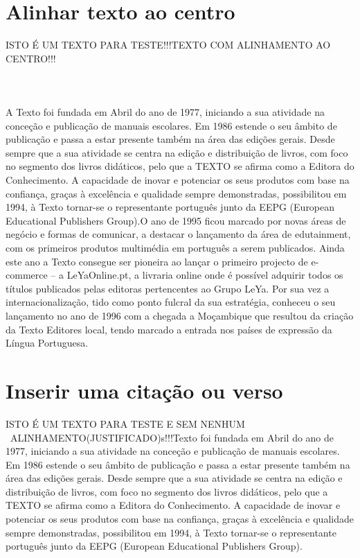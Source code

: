 \documentclass[a4paper,11pt]{article}%
\begin{document}
\section{Alinhar texto ao centro}
\begin{center}
ISTO É UM TEXTO PARA TESTE!!!\newline TEXTO COM ALINHAMENTO AO CENTRO!!!\newline \paragraph{\ \ }
A Texto foi fundada em Abril do ano de 1977, iniciando a sua atividade na conceção e publicação de manuais escolares. Em 1986 estende o seu âmbito de publicação e passa a estar presente também na área das edições gerais. Desde sempre que a sua atividade se centra na edição e distribuição de livros, com foco no segmento dos livros didáticos, pelo que a TEXTO se afirma como a Editora do Conhecimento. A capacidade de inovar e potenciar os seus produtos com base na confiança, graças à excelência e qualidade sempre demonstradas, possibilitou em 1994, à Texto tornar-se o representante português junto da EEPG (European Educational Publishers Group).O ano de 1995 ficou marcado por novas áreas de negócio e formas de comunicar, a destacar o lançamento da área de edutainment, com os primeiros produtos multimédia em português a serem publicados. Ainda este ano a Texto consegue ser pioneira ao lançar o primeiro projecto de e-commerce – a LeYaOnline.pt, a livraria online onde é possível adquirir todos os títulos publicados pelas editoras pertencentes ao Grupo LeYa. Por sua vez a internacionalização, tido como ponto fulcral da sua estratégia, conheceu o seu lançamento no ano de 1996 com a chegada a Moçambique que resultou da criação da Texto Editores local, tendo marcado a entrada nos países de expressão da Língua Portuguesa.
\end{center}


\newpage
\section{Inserir uma citação ou verso}
ISTO É UM TEXTO PARA TESTE E SEM NENHUM \ ALINHAMENTO(JUSTIFICADO)s!!!\newline  Texto foi fundada em Abril do ano de 1977, iniciando a sua atividade na conceção e publicação de manuais escolares. Em 1986 estende o seu âmbito de publicação e passa a estar presente também na área das edições gerais. Desde sempre que a sua atividade se centra na edição e distribuição de livros, com foco no segmento dos livros didáticos, pelo que a TEXTO se afirma como a Editora do Conhecimento. A capacidade de inovar e potenciar os seus produtos com base na confiança, graças à excelência e qualidade sempre demonstradas, possibilitou em 1994, à Texto tornar-se o representante português junto da EEPG (European Educational Publishers Group).
\end{document}
